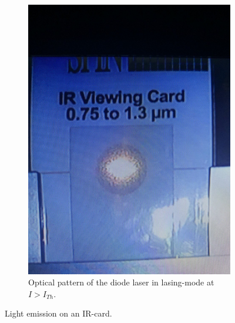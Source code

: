 \begin{figure}[!ht]
\begin{subfigure}{0.46\textwidth}
              \includegraphics[scale=0.2]{pictures/Spot2.jpg}%
              \caption{Optical pattern of the diode laser in lasing-mode at $I>I_{Th}$.}%
              \label{fig:Spot2}%
            \end{subfigure}%
            \caption{Light emission on an IR-card.}%
            \label{fig:Spots}%
          \end{figure}%
          \FloatBarrier
    \newpage
